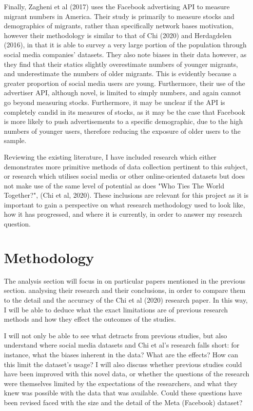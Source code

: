 \documentclass[12pt]{article}
\begin{document}
Finally, Zagheni et al (2017) uses the Facebook advertising API to measure migrant numbers 
in America. Their study is primarily to measure stocks and demographics of migrants, 
rather than specifically network bases motivation, however their methodology is similar to 
that of Chi (2020) and Herdagdelen (2016), in that it is able to survey a very large portion of 
the population through social media companies' datasets. They also note biases in their data 
however, as they find that their statics slightly overestimate numbers of younger 
migrants, and underestimate the numbers of older migrants. This is evidently because a 
greater proportion of social media users are young. Furthermore, their use of the advertiser 
API, although novel, is limited to simply numbers, and again cannot go beyond measuring stocks. 
Furthermore, it may be unclear if the API is completely candid in its measures of stocks, 
as it may be the case that Facebook is more likely to push advertisements to a 
specific demographic, due to the high numbers of younger users, therefore reducing the 
exposure of older users to the sample.

Reviewing the existing literature, I have included research which either demonstrates more 
primitive methods of data collection pertinent to this subject, or research which 
utilises social media or other online-oriented datasets but does not make use of the 
same level of potential as does "Who Ties The World Together?", (Chi et al, 2020). These 
inclusions are relevant for this project as it is important to gain a perspective on 
what research methodology used to look like, how it has progressed, and where it is currently,
in order to answer my research question.

\section{Methodology}

The analysis section will focus in on particular papers mentioned in the previous section. 
analysing their research and their conclusions, in order to compare them to the 
detail and the accuracy of the Chi et al (2020) research paper. In this way, I will be 
able to deduce what the exact limitations are of previous research methods and how they 
effect the outcomes of the studies. 

I will not only be able to see what detracts from previous studies, but also understand 
where social media datasets and Chi et al's research falls short: for instance, what 
the biases inherent in the data? What are the effects? How can this limit the dataset's usage?
I will also discuss whether previous studies could have been improved with this novel 
data, or whether the questions of the research were themselves limited by the expectations
of the researchers, and what they knew was possible with the data that was available. Could 
these questions have been revised faced with the size and the detail of the Meta (Facebook) dataset?
\end{document}
